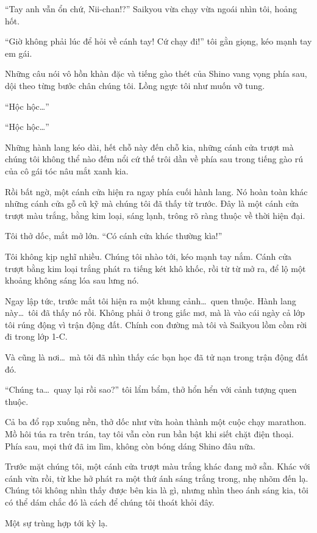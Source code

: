\documentclass[../main.tex]{subfiles}
\begin{document}
``Tay anh vẫn ổn chứ, Nii-chan!?'' Saikyou vừa chạy vừa ngoái nhìn tôi, hoảng hốt.

``Giờ không phải lúc để hỏi về cánh tay! Cứ chạy đi!'' tôi gằn giọng, kéo mạnh tay em gái.

Những câu nói vô hồn khàn đặc và tiếng gào thét của Shino vang vọng phía sau, dội theo từng bước chân chúng tôi. Lồng ngực tôi như muốn vỡ tung.

``Hộc hộc\dots''

``Hộc hộc\dots''

Những hành lang kéo dài, hết chỗ này đến chỗ kia, những cánh cửa trượt mà chúng tôi không thể nào đếm nổi cứ thế trôi dần về phía sau trong tiếng gào rú của cô gái tóc nâu mắt xanh kia.

Rồi bất ngờ, một cánh cửa hiện ra ngay phía cuối hành lang. Nó hoàn toàn khác những cánh cửa gỗ cũ kỹ mà chúng tôi đã thấy từ trước. Đây là một cánh cửa trượt màu trắng, bằng kim loại, sáng lạnh, trông rõ ràng thuộc về thời hiện đại.

Tôi thở dốc, mắt mở lớn. ``Có cánh cửa khác thường kìa!''

Tôi không kịp nghĩ nhiều. Chúng tôi nhào tới, kéo mạnh tay nắm. Cánh cửa trượt bằng kim loại trắng phát ra tiếng két khô khốc, rồi từ từ mở ra, để lộ một khoảng không sáng lóa sau lưng nó.

Ngay lập tức, trước mắt tôi hiện ra một khung cảnh\dots\ quen thuộc. Hành lang này\dots\ tôi đã thấy nó rồi. Không phải ở trong giấc mơ, mà là vào cái ngày cả lớp tôi rúng động vì trận động đất. Chính con đường mà tôi và Saikyou lồm cồm rời đi trong lớp 1-C.

Và cũng là nơi\dots\ mà tôi đã nhìn thấy các bạn học đã tử nạn trong trận động đất đó.

``Chúng ta\dots\ quay lại rồi sao?'' tôi lẩm bẩm, thở hổn hển với cảnh tượng quen thuộc.

Cả ba đổ rạp xuống nền, thở dốc như vừa hoàn thành một cuộc chạy marathon. Mồ hôi túa ra trên trán, tay tôi vẫn còn run bần bật khi siết chặt điện thoại. Phía sau, mọi thứ đã im lìm, không còn bóng dáng Shino đâu nữa.

Trước mặt chúng tôi, một cánh cửa trượt màu trắng khác đang mở sẵn. Khác với cánh vừa rồi, từ khe hở phát ra một thứ ánh sáng trắng trong, nhẹ nhõm đến lạ. Chúng tôi không nhìn thấy được bên kia là gì, nhưng nhìn theo ánh sáng kia, tôi có thể dám chắc đó là cách để chúng tôi thoát khỏi đây.

Một sự trùng hợp tới kỳ lạ.
\end{document}
